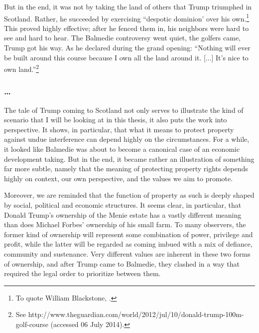 \documentclass[12pt,a4paper]{book} %
\begin{document}
But in the end, it was not by taking the land of others that Trump triumphed in Scotland. Rather, he succeeded by exercising ``despotic dominion' over his own.\footnote{To quote William Blackstone, \cite[2]{blackstone79b}.} This proved highly effective;  after he fenced them in, his neighbors were hard to see and hard to hear. The Balmedie controversy went quiet, the golfers came, Trump got his way. As he declared during the grand opening: ``Nothing will ever be built around this course because I own all the land around it. [...] It's nice to own land.''\footnote{See http://www.theguardian.com/world/2012/jul/10/donald-trump-100m-golf-course (accessed 06 July 2014).}

\subsubsection*{\ldots}

The tale of Trump coming to Scotland not only serves to illustrate the kind of scenario that I will be looking at in this thesis, it also puts the work into perspective. It shows, in particular, that what it means to protect property against undue interference can depend highly on the circumstances. For a while, it looked like Balmedie was about to become a canonical case of an economic development taking. But in the end, it became rather an illustration of something far more subtle, namely that the meaning of protecting property rights depends highly on context, our own perspective, and the values we aim to promote. 

Moreover, we are reminded that the function of property as such is deeply shaped by social, political and economic structures. It seems clear, in particular, that Donald Trump's ownership of the Menie estate has a vastly different meaning than does Michael Forbes' ownership of his small farm. To many observers, the former kind of ownership will represent some combination of power, privilege and profit, while the latter will be regarded as coming imbued with a mix of defiance, community and sustenance. Very different values are inherent in these two forms of ownership, and after Trump came to Balmedie, they clashed in a way that required the legal order to prioritize between them.
\end{document}
